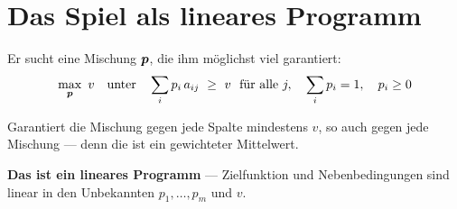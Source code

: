 \section{Das Spiel als lineares Programm}

\begin{merksatz}
Er sucht eine Mischung $\boldsymbol{p}$, die ihm möglichst viel garantiert:
\[ \max_{\boldsymbol{p}}\ v \quad\text{unter}\quad \sum_i p_i\,a_{ij} \ \ge\ v \ \ \text{für alle } j, \quad \sum_i p_i = 1, \quad p_i \ge 0 \]

Garantiert die Mischung gegen jede  Spalte mindestens $v$, so auch gegen jede Mischung --- denn die ist ein gewichteter Mittelwert.

\begin{center}
\begin{minipage}{0.9\textwidth}
\textbf{Das ist ein lineares Programm} --- Zielfunktion und Nebenbedingungen sind linear in den Unbekannten $p_1,\ldots,p_m$ und $v$.
\end{minipage}
\end{center}

\begin{center}
\begin{minipage}{0.88\textwidth}
\end{minipage}
\end{center}
\end{merksatz}

